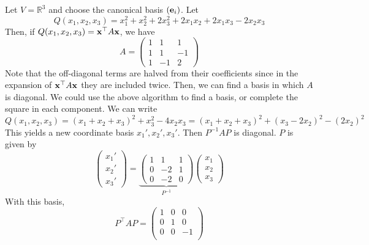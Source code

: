 \documentclass[a4paper,11pt]{article}
\begin{document}
\begin{example}
	Let \( V = \mathbb R^3 \) and choose the canonical basis \( ({\bf e}_i) \).
	Let
	\[
		Q(x_1, x_2, x_3) = x_1^2 + x_2^2 + 2x_3^2 + 2x_1 x_2 + 2x_1 x_3 - 2x_2 x_3
	\]
	Then, if \( Q(x_1, x_2, x_3) = {\bf x}^\top A {\bf x} \), we have
	\[
		A = \begin{pmatrix}
			1 & 1  & 1  \\
			1 & 1  & -1 \\
			1 & -1 & 2
		\end{pmatrix}
	\]
	Note that the off-diagonal terms are halved from their coefficients since in the expansion of \( {\bf x}^\top A {\bf x} \) they are included twice.
	Then, we can find a basis in which \( A \) is diagonal.
	We could use the above algorithm to find a basis, or complete the square in each component.
	We can write
	\[
		Q(x_1, x_2, x_3) = (x_1 + x_2 + x_3)^2 + x_3^2 - 4 x_2 x_3 = (x_1 + x_2 + x_3)^2 + (x_3 - 2x_2)^2 - (2x_2)^2
	\]
	This yields a new coordinate basis \( x_1', x_2', x_3' \).
	Then \( P^{-1} A P \) is diagonal.
	\( P \) is given by
	\[
		\begin{pmatrix} x_1' \\ x_2' \\ x_3' \end{pmatrix} = \underbrace{\begin{pmatrix} 1 & 1 & 1 \\ 0 & -2 & 1 \\ 0 & -2 & 0 \end{pmatrix}}_{P^{-1}} \begin{pmatrix} x_1 \\ x_2 \\ x_3 \end{pmatrix}
	\]
	With this basis, 
	\[
		P ^\top A P = \begin{pmatrix}
			1 & 0 &  0 \\
			0 & 1 &  0 \\
			0 & 0 &  -1 \\
		\end{pmatrix}
	\]
\end{example}
\end{document}
